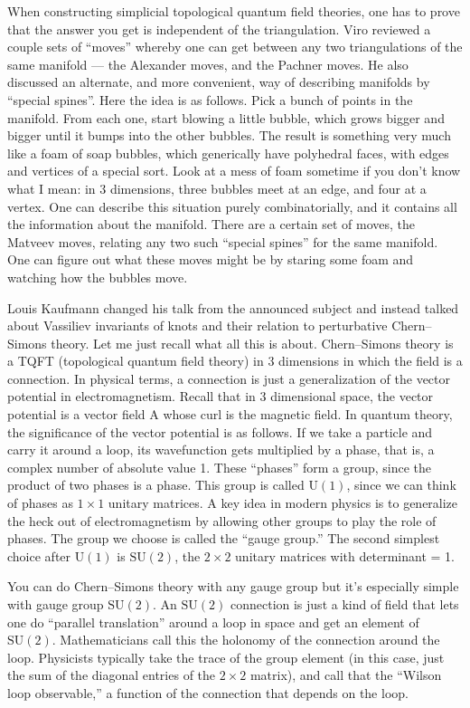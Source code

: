 \documentclass{article}
\begin{document}
When constructing simplicial topological quantum field theories, one has
to prove that the answer you get is independent of the triangulation.
Viro reviewed a couple sets of ``moves'' whereby one can get between any
two triangulations of the same manifold --- the Alexander moves, and the
Pachner moves. He also discussed an alternate, and more convenient, way
of describing manifolds by ``special spines''. Here the idea is as
follows. Pick a bunch of points in the manifold. From each one, start
blowing a little bubble, which grows bigger and bigger until it bumps
into the other bubbles. The result is something very much like a foam of
soap bubbles, which generically have polyhedral faces, with edges and
vertices of a special sort. Look at a mess of foam sometime if you don't
know what I mean: in 3 dimensions, three bubbles meet at an edge, and
four at a vertex. One can describe this situation purely
combinatorially, and it contains all the information about the manifold.
There are a certain set of moves, the Matveev moves, relating any two
such ``special spines'' for the same manifold. One can figure out what
these moves might be by staring some foam and watching how the bubbles
move.

Louis Kaufmann changed his talk from the announced subject and instead
talked about Vassiliev invariants of knots and their relation to
perturbative Chern--Simons theory. Let me just recall what all this is
about. Chern--Simons theory is a TQFT (topological quantum field theory)
in 3 dimensions in which the field is a connection. In physical terms, a
connection is just a generalization of the vector potential in
electromagnetism. Recall that in 3 dimensional space, the vector
potential is a vector field A whose curl is the magnetic field. In
quantum theory, the significance of the vector potential is as follows.
If we take a particle and carry it around a loop, its wavefunction gets
multiplied by a phase, that is, a complex number of absolute value 1.
These ``phases'' form a group, since the product of two phases is a
phase. This group is called \(\mathrm{U}(1)\), since we can think of
phases as \(1\times1\) unitary matrices. A key idea in modern physics is
to generalize the heck out of electromagnetism by allowing other groups
to play the role of phases. The group we choose is called the ``gauge
group.'' The second simplest choice after \(\mathrm{U}(1)\) is
\(\mathrm{SU}(2)\), the \(2\times2\) unitary matrices with determinant =
1.

You can do Chern--Simons theory with any gauge group but it's especially
simple with gauge group \(\mathrm{SU}(2)\). An \(\mathrm{SU}(2)\)
connection is just a kind of field that lets one do ``parallel
translation'' around a loop in space and get an element of
\(\mathrm{SU}(2)\). Mathematicians call this the holonomy of the
connection around the loop. Physicists typically take the trace of the
group element (in this case, just the sum of the diagonal entries of the
\(2\times2\) matrix), and call that the ``Wilson loop observable,'' a
function of the connection that depends on the loop.
\end{document}
